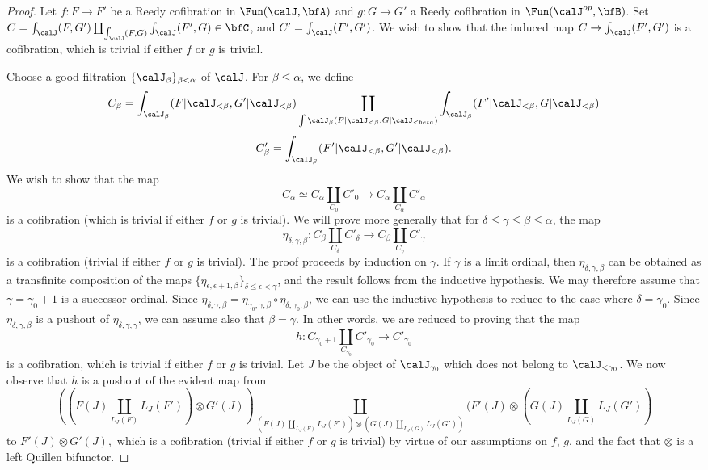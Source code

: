 \begin{proof}
Let $f: F \rightarrow F'$ be a Reedy cofibration in
$\Fun(\calJ, \bfA)$ and $g: G \rightarrow G'$ a Reedy cofibration in
$\Fun(\calJ^{op}, \bfB)$. Set $C = \int_{\calJ}(F,G') \coprod_{ \int_{\calJ}(F,G) } \int_{\calJ}(F',G) \in \bfC$, and $C' = \int_{\calJ}(F',G')$. We wish to show that the induced map
$C \rightarrow \int_{\calJ}(F',G')$ is a cofibration, which is trivial if either
$f$ or $g$ is trivial. 

Choose a good filtration $\{ \calJ_{\beta} \}_{\beta < \alpha}$ of $\calJ$.
For $\beta \leq \alpha$, we define
$$ C_{\beta} = \int_{ \calJ_{\beta}}( F|\calJ_{<\beta}, G'|\calJ_{<\beta})
\coprod_{ \int{\calJ_{\beta}}(F| \calJ_{<\beta}, G|\calJ_{<beta})} \int_{\calJ_{\beta}}( F'|\calJ_{<\beta}, G| \calJ_{<\beta})$$
$$ C'_{\beta} = \int_{\calJ_{\beta}}( F'| \calJ_{<\beta}, G'| \calJ_{<\beta}).$$
We wish to show that the map 
$$C_{\alpha} \simeq C_{\alpha} \coprod_{ C_0} C'_0 \rightarrow C_{\alpha}
\coprod_{ C_{\alpha} } C'_{\alpha}$$
is a cofibration (which is trivial if either $f$ or $g$ is trivial). We will prove more generally
that for $\delta \leq \gamma \leq \beta \leq \alpha$, the map
$$ \eta_{\delta, \gamma, \beta}: C_{\beta} \coprod_{ C_{\delta} } C'_{\delta} \rightarrow
C_{\beta} \coprod_{ C_{\gamma} } C'_{\gamma}$$
is a cofibration (trivial if either $f$ or $g$ is trivial).
The proof proceeds by induction on $\gamma$. If $\gamma$ is a limit ordinal,
then $\eta_{\delta, \gamma, \beta}$ can be obtained as a transfinite composition of the maps
$\{ \eta_{\epsilon, \epsilon+1, \beta} \}_{ \delta \leq \epsilon < \gamma}$, and the result follows from the inductive hypothesis. We may therefore assume that $\gamma = \gamma_0 +1$ is a successor ordinal. Since $\eta_{\delta, \gamma, \beta} = \eta_{ \gamma_0, \gamma, \beta} \circ \eta_{ \delta, \gamma_0, \beta}$, we can use the inductive hypothesis to reduce to the case where $\delta = \gamma_0$. Since $\eta_{\delta, \gamma, \beta}$ is a pushout of
$\eta_{\delta, \gamma, \gamma}$, we can assume also that $\beta = \gamma$. In other words, we are reduced to proving that the map
$$ h: C_{\gamma_0+1} \coprod_{ C_{\gamma_0} } C'_{\gamma_0} \rightarrow C'_{\gamma_0}$$
is a cofibration, which is trivial if either $f$ or $g$ is trivial. Let $J$ be the object of
$\calJ_{\gamma_0}$ which does not belong to $\calJ_{< \gamma_0}$. We now observe
that $h$ is a pushout of the evident map from
$$ ((F(J) \coprod_{L_J(F)} L_J(F') ) \otimes G'(J))
\coprod_{ (F(J) \coprod_{L_J(F)} L_J(F')) \otimes (G(J) \coprod_{L_J(G)} L_J(G'))}
(F'(J) \otimes (G(J) \coprod_{ L_J(G)} L_J(G'))$$
to $F'(J) \otimes G'(J),$
which is a cofibration (trivial if either $f$ or $g$ is trivial) by virtue of our assumptions on $f$, $g$, and the fact that $\otimes$ is a left Quillen bifunctor.
\end{proof}

